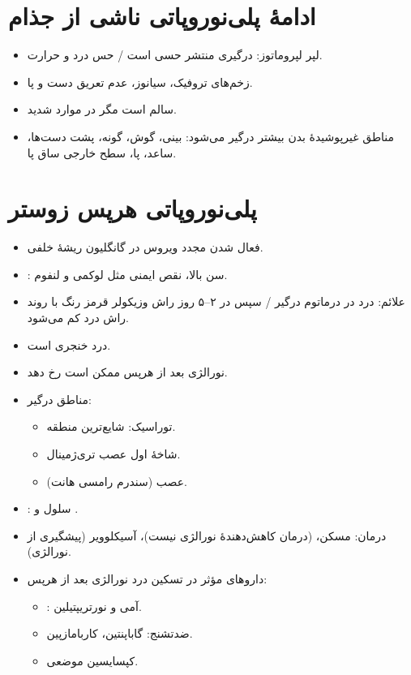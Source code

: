 \documentclass[a4paper,12pt]{extbook}
\begin{document}
\section*{ادامهٔ پلی‌نوروپاتی ناشی از جذام}
\begin{itemize}
\item لپر لپروماتوز: درگیری منتشر حسی است / حس درد و حرارت.
\item زخم‌های تروفیک، سیانوز، عدم تعریق دست و پا.
\item {} سالم است مگر در موارد شدید.
\item مناطق غیرپوشیدهٔ بدن بیشتر درگیر می‌شود: بینی، گوش، گونه، پشت دست‌ها، ساعد، پا، سطح خارجی ساق پا.
\end{itemize}
\section*{پلی‌نوروپاتی هرپس زوستر}
\begin{itemize}
\item فعال شدن مجدد ویروس در گانگلیون ریشهٔ خلفی.
\item {}: سن بالا، نقص ایمنی مثل لوکمی و لنفوم.
\item علائم: درد در درماتوم درگیر / سپس در ۲–۵ روز راش وزیکولر قرمز رنگ با روند راش درد کم می‌شود.
\item درد خنجری است.
\item نورالژی بعد از هرپس ممکن است رخ دهد.
\item مناطق درگیر:
\begin{itemize}
\item توراسیک: شایع‌ترین منطقه.
\item شاخهٔ اول عصب تری‌ژمینال.
\item عصب  (سندرم رامسی هانت).
\end{itemize}
\item {}: \PNDen{$\uparrow$} سلول و .
\item درمان: مسکن،  (درمان کاهش‌دهندهٔ نورالژی نیست)، آسیکلوویر (پیشگیری از نورالژی).
\item داروهای مؤثر در تسکین درد نورالژی بعد از هرپس:
\begin{itemize}
\item {}: آمی و نورتریپتیلین.
\item ضدتشنج: گاباپنتین، کاربامازپین.
\item کپسایسین موضعی.
\end{itemize}
\end{itemize}
\end{document}
